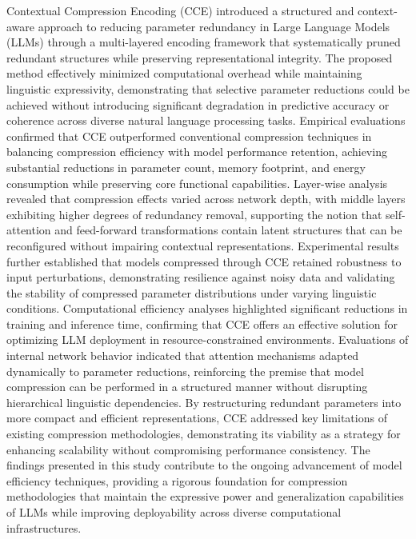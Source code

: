\documentclass{article}
\begin{document}
Contextual Compression Encoding (CCE) introduced a structured and context-aware approach to reducing parameter redundancy in Large Language Models (LLMs) through a multi-layered encoding framework that systematically pruned redundant structures while preserving representational integrity. The proposed method effectively minimized computational overhead while maintaining linguistic expressivity, demonstrating that selective parameter reductions could be achieved without introducing significant degradation in predictive accuracy or coherence across diverse natural language processing tasks. Empirical evaluations confirmed that CCE outperformed conventional compression techniques in balancing compression efficiency with model performance retention, achieving substantial reductions in parameter count, memory footprint, and energy consumption while preserving core functional capabilities. Layer-wise analysis revealed that compression effects varied across network depth, with middle layers exhibiting higher degrees of redundancy removal, supporting the notion that self-attention and feed-forward transformations contain latent structures that can be reconfigured without impairing contextual representations. Experimental results further established that models compressed through CCE retained robustness to input perturbations, demonstrating resilience against noisy data and validating the stability of compressed parameter distributions under varying linguistic conditions. Computational efficiency analyses highlighted significant reductions in training and inference time, confirming that CCE offers an effective solution for optimizing LLM deployment in resource-constrained environments. Evaluations of internal network behavior indicated that attention mechanisms adapted dynamically to parameter reductions, reinforcing the premise that model compression can be performed in a structured manner without disrupting hierarchical linguistic dependencies. By restructuring redundant parameters into more compact and efficient representations, CCE addressed key limitations of existing compression methodologies, demonstrating its viability as a strategy for enhancing scalability without compromising performance consistency. The findings presented in this study contribute to the ongoing advancement of model efficiency techniques, providing a rigorous foundation for compression methodologies that maintain the expressive power and generalization capabilities of LLMs while improving deployability across diverse computational infrastructures.




\end{document}
